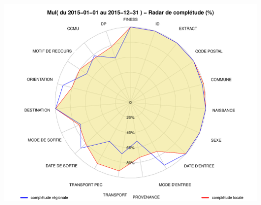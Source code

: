 \documentclass[]{article}
\begin{document}
\includegraphics{completude_files/figure-latex/finess-3.pdf}
\end{document}
